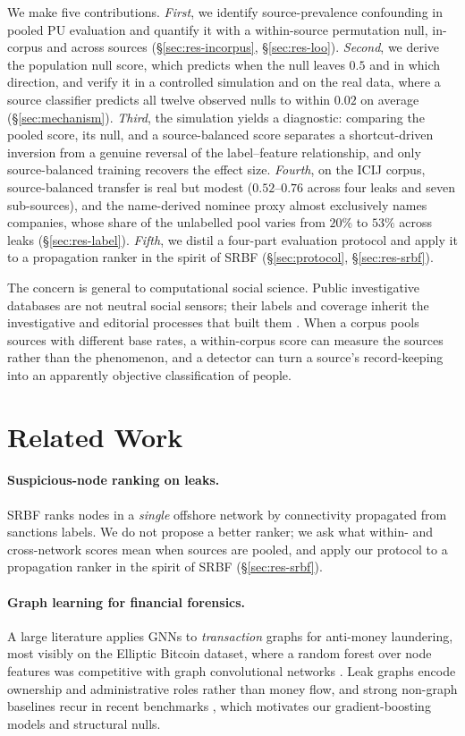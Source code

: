 \documentclass[11pt]{article}
\begin{document}
We make five contributions. \emph{First}, we identify source-prevalence
confounding in pooled PU evaluation and quantify it with a within-source
permutation null, in-corpus and across sources (\S\ref{sec:res-incorpus},
\S\ref{sec:res-loo}). \emph{Second}, we derive the population null score, which
predicts when the null leaves $0.5$ and in which direction, and verify it in a
controlled simulation and on the real data, where a source classifier predicts all
twelve observed nulls to within $0.02$ on average (\S\ref{sec:mechanism}).
\emph{Third}, the simulation yields a diagnostic: comparing the pooled score, its
null, and a source-balanced score separates a shortcut-driven inversion from a
genuine reversal of the label--feature relationship, and only source-balanced
training recovers the effect size. \emph{Fourth}, on the ICIJ corpus, source-balanced
transfer is real but modest ($0.52$--$0.76$ across four leaks and seven
sub-sources), and the name-derived nominee proxy almost exclusively names
companies, whose share of the unlabelled pool varies from $20\%$ to $53\%$ across
leaks (\S\ref{sec:res-label}). \emph{Fifth}, we distil a four-part evaluation
protocol and apply it to a propagation ranker in the spirit of SRBF
(\S\ref{sec:protocol}, \S\ref{sec:res-srbf}).

The concern is general to computational social science. Public investigative
databases are not neutral social sensors; their labels and coverage inherit the
investigative and editorial processes that built them
\citep{compjourn,olteanu2019social}. When a corpus pools sources with different
base rates, a within-corpus score can measure the sources rather than the
phenomenon, and a detector can turn a source's record-keeping into an apparently
objective classification of people.

\section{Related Work}
\paragraph{Suspicious-node ranking on leaks.} SRBF \citep{srbf} ranks nodes in a
\emph{single} offshore network by connectivity propagated from sanctions labels.
We do not propose a better ranker; we ask what within- and cross-network scores
mean when sources are pooled, and apply our protocol to a propagation ranker in
the spirit of SRBF (\S\ref{sec:res-srbf}).
\paragraph{Graph learning for financial forensics.} A large literature applies
GNNs to \emph{transaction} graphs for anti-money laundering, most visibly on the
Elliptic Bitcoin dataset, where a random forest over node features was competitive
with graph convolutional networks \citep{aml}. Leak graphs encode ownership and
administrative roles rather than money flow, and strong non-graph baselines recur
in recent benchmarks \citep{graphland}, which motivates our gradient-boosting
models and structural nulls.
\end{document}
